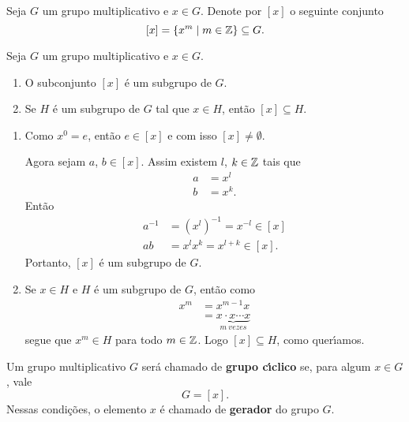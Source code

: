 \begin{definicao}
    Seja $G$ um grupo multiplicativo e $x \in G$. Denote por $[x]$ o seguinte conjunto
    \[
        [x] = \{x^m \mid m \in \mathbb{Z}\} \subseteq G.
    \]
\end{definicao}

\begin{proposicao}
    Seja $G$ um grupo multiplicativo e $x \in G$.
    \begin{enumerate}[label={\roman*})]
        \item O subconjunto $[x]$ \'e um subgrupo de $G$.

        \item Se $H$ \'e um subgrupo de $G$ tal que $x \in H$, ent\~ao $[x] \subseteq H$.
    \end{enumerate}
\end{proposicao}
\begin{prova}
    \begin{enumerate}[label={\roman*})]
        \item Como $x^0 = e$, ent\~ao $e \in [x]$ e com isso $[x] \ne \emptyset$.

        Agora sejam $a$, $b \in [x]$. Assim existem $l$, $k \in \mathbb{Z}$ tais que
        \begin{align*}
            a &= x^l\\
            b &= x^k.
        \end{align*}
        Ent\~ao
        \begin{align*}
            a^{-1} &= (x^l)^{-1} = x^{-l} \in [x]\\
            ab &= x^lx^k = x^{l + k} \in [x].
        \end{align*}
        Portanto, $[x]$ \'e um subgrupo de $G$.

        \item Se $x \in H$ e $H$ \'e um subgrupo de $G$, ent\~ao como
        \begin{align*}
            x^m &=  x^{m-1}x\\
            &=\underbrace{x\cdot x \cdots x}_{m\ vezes}
        \end{align*}
        segue que $x^m \in H$ para todo $m \in \mathbb{Z}$. Logo $[x] \subseteq H$, como quer{\'\i}amos.
    \end{enumerate}
\end{prova}

\begin{definicao}
    Um grupo multiplicativo $G$ ser\'a chamado de \textbf{grupo c{\'\i}clico} se, para algum $x \in G$, vale
    \[
        G = [x].
    \]
    Nessas condi\c{c}\~oes, o elemento $x$  \'e chamado de \textbf{gerador} do grupo $G$.
\end{definicao}

